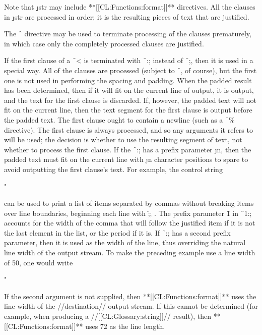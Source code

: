 Note that \j{str} may include **[[CL:Functions:format]]** directives.
All the clauses in \j{str} are processed in order;
it is the resulting pieces of text that are justified.


The \f{~\hat } directive may be used to terminate processing of the
clauses prematurely, in which case only the completely processed clauses
are justified.


If the first clause of a \f{~<} 
is terminated with \f{~:;} instead of
\f{~;}, then it is used in a special way.  All of the clauses are
processed (subject to \f{~\hat }, of course), but the 
first one is not used
in performing the spacing and padding.  When the padded result has been
determined, then if it will fit on the current line of output, it is
output, and the text for the first clause is discarded.  If, however, the
padded text will not fit on the current line, then the text segment for
the first clause is output before the padded text.  The first clause
ought to contain a newline (such as a \f{~\%} directive).  The first
clause is always processed, and so any arguments it refers to will be
used; the decision is whether to use the resulting segment of text, not
whether to process the first clause.  If the \f{~:;} has a prefix
parameter \j{n}, then the padded text must fit on the current line with
\j{n} character positions to spare to avoid outputting the first clause's
text.  For example, the control string

\code
 "~%
\endcode

can be used to print a list of items separated by commas without
breaking items over line boundaries, beginning each line with
\f{;; }.  The prefix parameter 
\f{1} in \f{~1:;} accounts for the width of the
comma that will follow the justified item if it is not the last
element in the list, or the period 
if it is.  If \f{~:;} has a second
prefix parameter, then it is used as the width of the line,
thus overriding the natural line width of the output stream.  To make
the preceding example use a line width of 50, one would write
     
\code
 "~%
\endcode

If the second argument is not supplied, then **[[CL:Functions:format]]** uses the
line width of the //destination// output stream.
If this cannot be determined (for example, when producing a 
//[[CL:Glossary:string]]// result), then **[[CL:Functions:format]]** uses \f{72} as the line length.

